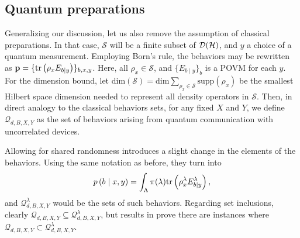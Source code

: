         \subsection{Quantum preparations}
        \label{sec:quantum-behaviors}

            Generalizing our discussion, let us also remove the assumption of classical preparations. In that case, $\mathcal{S}$ will be a finite subset of $\mathcal{D}(\mathcal{H})$, and $y$ a choice of a quantum measurement. Employing Born's rule, the behaviors may be rewritten as $\mathbf{p} = \{ \text{tr}\left( \rho_x E_{b \vert y} \right) \}_{b,x,y}$. Here, all $\rho_x \in \mathcal{S}$, and $\{ E_{b \mid y} \}_b$ is a POVM for each $y$. For the dimension bound, let $\text{dim}(\mathcal{S}) = \text{dim} \sum_{\rho_x \in \mathcal{S}}\text{supp}\left( \rho_x \right)$ be the smallest Hilbert space dimension needed to represent all density operators in $\mathcal{S}$. Then, in direct analogy to the classical behaviors sets, for any fixed $X$ and $Y$, we define $\mathcal{Q}_{d,B,X,Y}$ as the set of behaviors arising from quantum communication with uncorrelated devices.
            
            Allowing for shared randomness introduces a slight change in the elements of the behaviors. Using the same notation as before, they turn into
            $$
                p \left( b \mid x,y \right) =  \int_\Lambda \pi(\lambda) \text{tr}\left( \rho_x^\lambda E_{b \vert y}^\lambda \right) ,
            $$
			and $\mathcal{Q}^\lambda_{d,B,X,Y}$ would be the sets of such behaviors. Regarding set inclusions, clearly $\mathcal{Q}_{d,B,X,Y} \subseteq \mathcal{Q}^\lambda_{d,B,X,Y}$, but results in \cite{ambainis_srqracs_2009} prove there are instances where $\mathcal{Q}_{d,B,X,Y} \subset \mathcal{Q}^\lambda_{d,B,X,Y}$.
            
